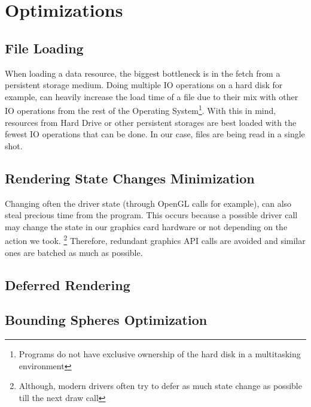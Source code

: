 \section{Optimizations}

\subsection{File Loading}
When loading a data resource, the biggest bottleneck is in the fetch from a persistent storage medium.
Doing multiple IO operations on a hard disk for example, can heavily increase the load time of a file
due to their mix with other IO operations from the rest of the Operating System\footnote{Programs do
not have exclusive ownership of the hard disk in a multitasking environment}. With this in mind, resources
from Hard Drive or other persistent storages are best loaded with the fewest IO operations that can be done.
In our case, files are being read in a single shot.

\subsection{Rendering State Changes Minimization}
Changing often the driver state (through OpenGL calls for example), can also steal precious time from the program.
This occurs because a possible driver call may change the state in our graphics card hardware or not depending
on the action we took. \footnote{Although, modern drivers often try to defer as much state change as possible
till the next draw call} Therefore, redundant graphics API calls are avoided and similar ones are batched
as much as possible.

\subsection{Deferred Rendering}

\subsection{Bounding Spheres Optimization}
